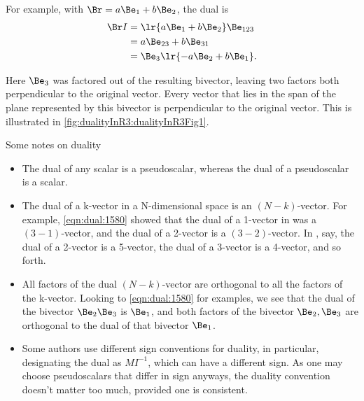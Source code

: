 For example, with \( \Br = a \Be_1 + b \Be_2 \), the dual is
\begin{equation}\label{eqn:dual:1640}
\begin{aligned}
\Br I 
&= \lr{ a \Be_1 + b \Be_2 } \Be_{123} \\
&= a \Be_{23} + b \Be_{31} \\
&= \Be_3 \lr{ -a \Be_{2} + b \Be_{1} }.
\end{aligned}
\end{equation}

Here \( \Be_3 \) was factored out of the resulting bivector, leaving two factors both perpendicular to the original vector.  Every vector that lies in the span of the plane represented by this bivector is perpendicular to the original vector.
This is illustrated in \cref{fig:dualityInR3:dualityInR3Fig1}.



Some notes on duality

\begin{itemize}
\item The dual of any scalar is a pseudoscalar, whereas the dual of a pseudoscalar is a scalar.
\item The dual of a k-vector in a N-dimensional space is an \((N-k)\)-vector.
For example, \cref{eqn:dual:1580} showed that the dual of a 1-vector in  was a \((3-1)\)-vector, and the dual of a 2-vector is a \((3-2)\)-vector.  In , say, the dual of a 2-vector is a 5-vector, the dual of a 3-vector is a 4-vector, and so forth.
\item All factors of the dual \((N-k)\)-vector are orthogonal to all the factors of the k-vector.  Looking to \cref{eqn:dual:1580} for examples, we see that the dual of the bivector \( \Be_2 \Be_3 \) is \( \Be_1 \), and both factors of the bivector \( \Be_2, \Be_3 \) are orthogonal to the dual of that bivector \( \Be_1 \).
\item Some authors use different sign conventions for duality, in particular, designating the dual as \( M I^{-1} \), which can have a different sign.  As one may choose pseudoscalars that differ in sign anyways, the duality convention doesn't matter too much, provided one is consistent.
\end{itemize}

